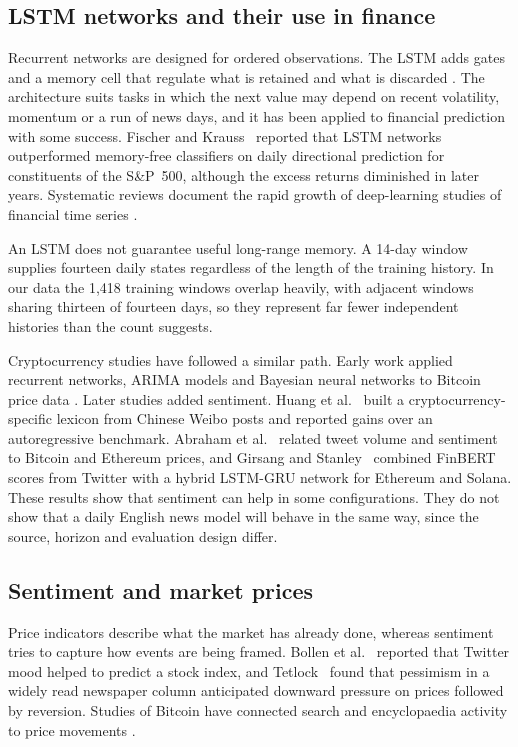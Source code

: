 \subsection{LSTM networks and their use in finance}
Recurrent networks are designed for ordered observations. The LSTM adds gates and a memory cell that regulate what is retained and what is discarded \cite{hochreiter1997,gers2000}. The architecture suits tasks in which the next value may depend on recent volatility, momentum or a run of news days, and it has been applied to financial prediction with some success. Fischer and Krauss~\cite{fischer2018} reported that LSTM networks outperformed memory-free classifiers on daily directional prediction for constituents of the S\&P~500, although the excess returns diminished in later years. Systematic reviews document the rapid growth of deep-learning studies of financial time series \cite{sezer2020}.

An LSTM does not guarantee useful long-range memory. A 14-day window supplies fourteen daily states regardless of the length of the training history. In our data the 1,418 training windows overlap heavily, with adjacent windows sharing thirteen of fourteen days, so they represent far fewer independent histories than the count suggests.

Cryptocurrency studies have followed a similar path. Early work applied recurrent networks, ARIMA models and Bayesian neural networks to Bitcoin price data \cite{mcnally2018,jang2018}. Later studies added sentiment. Huang et al.~\cite{huang2021} built a cryptocurrency-specific lexicon from Chinese Weibo posts and reported gains over an autoregressive benchmark. Abraham et al.~\cite{abraham2018} related tweet volume and sentiment to Bitcoin and Ethereum prices, and Girsang and Stanley~\cite{girsang2023} combined FinBERT scores from Twitter with a hybrid LSTM-GRU network for Ethereum and Solana. These results show that sentiment can help in some configurations. They do not show that a daily English news model will behave in the same way, since the source, horizon and evaluation design differ.

\subsection{Sentiment and market prices}
Price indicators describe what the market has already done, whereas sentiment tries to capture how events are being framed. Bollen et al.~\cite{bollen2011} reported that Twitter mood helped to predict a stock index, and Tetlock~\cite{tetlock2007} found that pessimism in a widely read newspaper column anticipated downward pressure on prices followed by reversion. Studies of Bitcoin have connected search and encyclopaedia activity to price movements \cite{kristoufek2013}.


